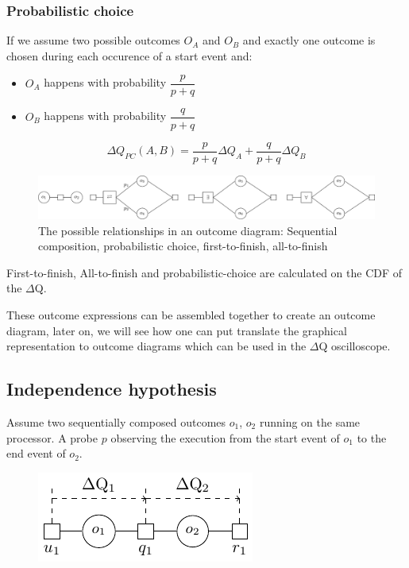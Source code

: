     \subsubsection{Probabilistic choice}
        If we assume two possible outcomes $O_A$ and $O_B$ and exactly one outcome is chosen during each occurence of a start event and:
        \begin{itemize}
            \item $O_A$ happens with probability $\dfrac{p}{p+q}$
            \item $O_B$ happens with probability $\dfrac{q}{p + q}$
        \end{itemize}
        \begin{equation}
           \Delta Q_{PC}(A, B) = \dfrac{p}{p + q}\Delta Q_A + \dfrac{q}{p + q}\Delta Q_B 
            \label{eq:pc}
        \end{equation} 

    \begin{figure}[H]
        \begin{center}
            \includegraphics[width = \textwidth]{tikz/op.pdf}
        \end{center}
        \caption{The possible relationships in an outcome diagram: Sequential composition, probabilistic choice, first-to-finish, all-to-finish}
    \end{figure}
    First-to-finish, All-to-finish and probabilistic-choice are calculated on the CDF of the $\Delta$Q.
    
    These outcome expressions can be assembled together to create an outcome diagram, later on, we will see how one can put translate the graphical representation to outcome diagrams which can be used in the $\Delta$Q oscilloscope.
    
    \subsection{Independence hypothesis}    
        Assume two sequentially composed outcomes $o_1$, $o_2$ running on the same processor. A probe $p$ observing the execution from the start event of $o_1$ to the end event of $o_2$. 
        \begin{figure}[H]
            \begin{center}
                \includegraphics[scale=1.2]{tikz/indep.pdf}
            \end{center}
        \end{figure}
        
